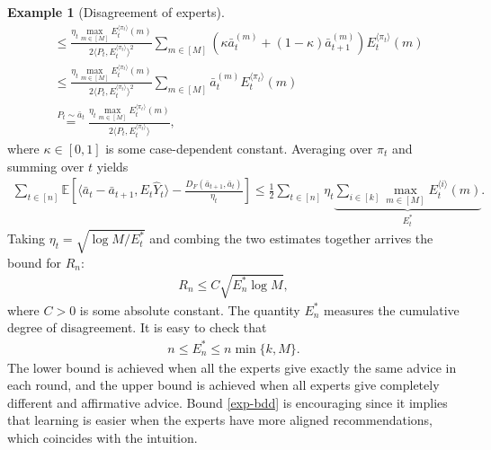 \documentclass[10pt,a4article]{article}
\numberwithin{equation}{section}
\theoremstyle{plain}
\theoremstyle{definition}
\newtheorem{Ex}[Th]{Example}
\def\E{{\mathbb E}}
\begin{document}
\begin{Ex}[Disagreement of experts]
\begin{align*}
& \leq\frac{\eta_t\max_{m\in [M]}E_{t}^{\langle \pi_t \rangle}(m)}{2\langle P_t, E_t^{\langle\pi_t\rangle}\rangle^2}\sum_{m\in [M]}\left(\kappa \bar{a}_t^{(m)}+(1-\kappa) \bar{a}_{t+1}^{(m)}\right)E_t^{\langle\pi_t\rangle}(m)\\
&\leq\frac{\eta_t\max_{m\in [M]}E_{t}^{\langle \pi_t \rangle}(m)}{2\langle P_t, E_t^{\langle\pi_t\rangle}\rangle^2}\sum_{m\in [M]}\bar{a}_t^{(m)}E_t^{\langle\pi_t\rangle}(m)\\
&\stackrel{P_t\sim\bar{a}_t}{=}\frac{\eta_t\max_{m\in [M]}E_{t}^{\langle \pi_t \rangle}(m)}{2\langle P_t, E_t^{\langle\pi_t\rangle}\rangle},
\end{align*} 
where $\kappa\in [0,1]$ is some case-dependent constant. Averaging over $\pi_t$ and summing over $t$ yields
\begin{align*}
\sum_{t\in [n]}\E\left[\langle \bar{a}_t- \bar{a}_{t+1}, E_t\hat{Y}_t\rangle-\frac{D_F(\bar{a}_{t+1}, \bar{a}_t)}{\eta_t}\right]\leq\frac{1}{2}\sum_{t\in [n]}\eta_t\underbrace{\sum_{i\in [k]}\max_{m\in [M]}E_t^{\langle i \rangle}(m)}_{E^*_t}. 
\end{align*}
Taking $\eta_t = \sqrt{\log M/E_t^*}$ and combing the two estimates together arrives the bound for $R_n$:
\begin{align}
R_n\leq C\sqrt{E_n^*\log M}, \label{exp-bdd}
\end{align}
where $C>0$ is some absolute constant. The quantity $E_n^*$ measures the cumulative degree of disagreement. It is easy to check that
\begin{align*}
n\leq E_n^*\leq n\min\{k, M\}.
\end{align*}
The lower bound is achieved when all the experts give exactly the same advice in each round, and the upper bound is achieved when all experts give completely different and affirmative advice.  Bound \eqref{exp-bdd} is encouraging since it implies that learning is easier when the experts have more aligned recommendations, which coincides with the intuition.  
\end{Ex}
\end{document}

